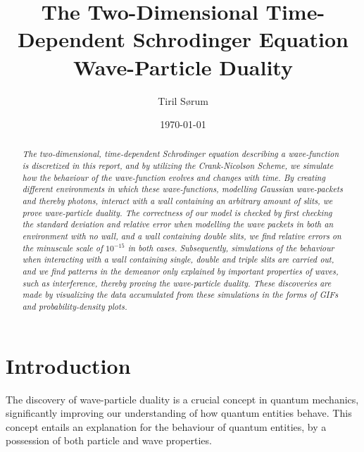 \documentclass[10pt, nofootinbib, twocolumn]{revtex4-1}
\begin{document}
\vspace*{5\baselineskip}
\title{The Two-Dimensional Time-Dependent Schrodinger Equation \\ Wave-Particle Duality} 
\author{Tiril Sørum}
\date{\today}        
\begin{abstract}
\vspace*{4\baselineskip}
    \textit{The two-dimensional, time-dependent Schrodinger equation describing a wave-function is discretized in this report, and by utilizing \textit{the Crank-Nicolson Scheme}, we simulate how the behaviour of the wave-function evolves and changes with time. By creating different environments in which these wave-functions, modelling Gaussian wave-packets and thereby photons, interact with a wall containing an arbitrary amount of slits, we prove wave-particle duality. The correctness of our model is checked by first checking the standard deviation and relative error when modelling the wave packets in both an environment with no wall, and a wall containing double slits, we find relative errors on the minuscule scale of $10^{-15}$ in both cases. Subsequently, simulations of the behaviour when interacting with a wall containing single, double and triple slits are carried out, and we find patterns in the demeanor only explained by important properties of waves, such as interference, thereby proving the wave-particle duality. These discoveries are made by visualizing the data accumulated from these simulations in the forms of GIFs and probability-density plots. }
\end{abstract}
\maketitle       
\vspace*{2\baselineskip}

\section{Introduction}\label{sec:introduction}
The discovery of wave-particle duality is a crucial concept in quantum mechanics, significantly improving our understanding of how quantum entities behave. This concept entails an explanation for the behaviour of quantum entities, by a possession of both particle and wave properties. \\
\end{document}
